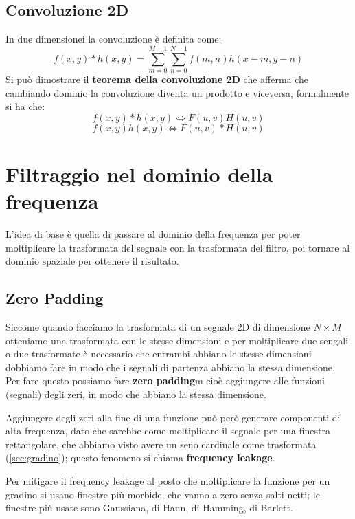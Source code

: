 \subsection{Convoluzione 2D}
In due dimensionei la convoluzione è definita come:
\begin{equation}
	f(x,y) * h(x,y) = \sum_{m=0}^{M-1}\sum_{n=0}^{N-1} f(m,n) h(x-m, y-n)
\end{equation}
Si può dimostrare il \textbf{teorema della convoluzione 2D} che afferma che cambiando dominio la convoluzione diventa un prodotto e viceversa, formalmente si ha che:
\begin{equation}
	f(x,y)*h(x,y)  \Longleftrightarrow F(u,v)H(u,v)
\end{equation}
\begin{equation}
	f(x,y)h(x,y)  \Longleftrightarrow F(u,v)*H(u,v)
\end{equation}

\section{Filtraggio nel dominio della frequenza}
L'idea di base è quella di passare al dominio della frequenza per poter moltiplicare la trasformata del segnale con la trasformata del filtro, poi tornare al dominio spaziale per ottenere il risultato.

\subsection{Zero Padding}
Siccome quando facciamo la trasformata di un segnale 2D di dimensione $N\times M$ otteniamo una trasformata con le stesse dimensioni e per moltiplicare due sengali o due trasformate è necessario che entrambi abbiano le stesse dimensioni dobbiamo fare in modo che i segnali di partenza abbiano la stessa dimensione. Per fare questo possiamo fare \textbf{zero padding}m cioè aggiungere alle funzioni (segnali) degli zeri, in modo che abbiano la stessa dimensione.

Aggiungere degli zeri alla fine di una funzione può però generare componenti di alta frequenza, dato che sarebbe come moltiplicare il segnale per una finestra rettangolare, che abbiamo visto avere un seno cardinale come trasformata (\ref{sec:gradino}); questo fenomeno si chiama \textbf{frequency leakage}.

Per mitigare il frequency leakage al posto che moltiplicare la funzione per un gradino si usano finestre più morbide, che vanno a zero senza salti netti; le finestre più usate sono Gaussiana, di Hann, di Hamming, di Barlett.

